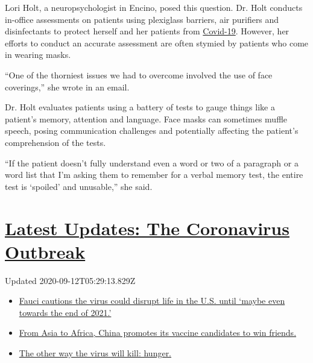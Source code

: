 Lori Holt, a neuropsychologist in Encino, posed this question. Dr. Holt
conducts in-office assessments on patients using plexiglass barriers,
air purifiers and disinfectants to protect herself and her patients from
\href{https://www.nytimes3xbfgragh.onion/2020/06/29/us/california-coronavirus-reopening.html}{Covid-19}.
However, her efforts to conduct an accurate assessment are often stymied
by patients who come in wearing masks.

``One of the thorniest issues we had to overcome involved the use of
face coverings,'' she wrote in an email.

Dr. Holt evaluates patients using a battery of tests to gauge things
like a patient's memory, attention and language. Face masks can
sometimes muffle speech, posing communication challenges and potentially
affecting the patient's comprehension of the tests.

``If the patient doesn't fully understand even a word or two of a
paragraph or a word list that I'm asking them to remember for a verbal
memory test, the entire test is `spoiled' and unusable,'' she said.

\hypertarget{latest-updates-the-coronavirus-outbreak}{%
\section{\texorpdfstring{\href{https://www.nytimes3xbfgragh.onion/2020/09/11/world/covid-19-coronavirus.html?action=click\&pgtype=Article\&state=default\&region=MAIN_CONTENT_1\&context=storylines_live_updates}{Latest
Updates: The Coronavirus
Outbreak}}{Latest Updates: The Coronavirus Outbreak}}\label{latest-updates-the-coronavirus-outbreak}}

Updated 2020-09-12T05:29:13.829Z

\begin{itemize}
\tightlist
\item
  \href{https://www.nytimes3xbfgragh.onion/2020/09/11/world/covid-19-coronavirus.html?action=click\&pgtype=Article\&state=default\&region=MAIN_CONTENT_1\&context=storylines_live_updates\#link-dfb8a16}{Fauci
  cautions the virus could disrupt life in the U.S. until `maybe even
  towards the end of 2021.'}
\item
  \href{https://www.nytimes3xbfgragh.onion/2020/09/11/world/covid-19-coronavirus.html?action=click\&pgtype=Article\&state=default\&region=MAIN_CONTENT_1\&context=storylines_live_updates\#link-7104d154}{From
  Asia to Africa, China promotes its vaccine candidates to win friends.}
\item
  \href{https://www.nytimes3xbfgragh.onion/2020/09/11/world/covid-19-coronavirus.html?action=click\&pgtype=Article\&state=default\&region=MAIN_CONTENT_1\&context=storylines_live_updates\#link-393ad215}{The
  other way the virus will kill: hunger.}
\end{itemize}

